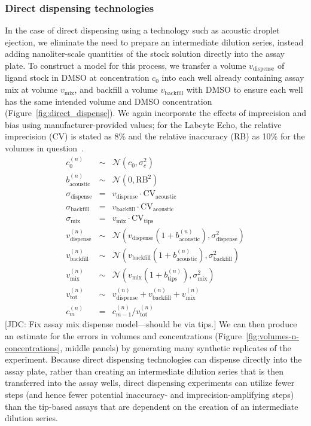 \documentclass[aps,pre,twocolumn,nofootinbib,superscriptaddress,linenumbers]{revtex4-1}
\begin{document}
\subsubsection*{Direct dispensing technologies}

In the case of direct dispensing using a technology such as acoustic droplet ejection, we eliminate the need to prepare an intermediate dilution series, instead adding nanoliter-scale quantities of the stock solution directly into the assay plate.
To construct a model for this process, we transfer a volume $v_\mathrm{dispense}$ of ligand stock in DMSO at concentration $c_0$ into each well already containing assay mix at volume $v_\mathrm{mix}$, and backfill a volume $v_\mathrm{backfill}$ with DMSO to ensure each well has the same intended volume and DMSO concentration (Figure~\ref{fig:direct_dispense}). 
We again incorporate the effects of imprecision and bias using manufacturer-provided values;
for the Labcyte Echo, the relative imprecision (CV) is stated as 8\% and the relative inaccuracy (RB) as 10\% for the volumes in question~\cite{_echo_2011}.
\begin{eqnarray}
c_0^{(n)} &\sim& \mathcal{N}(c_0, \sigma_c^2) \nonumber \label{equation:stock-concentration-uncertainty-simple} \\
b_\mathrm{acoustic}^{(n)} &\sim& \mathcal{N}(0, \mathrm{RB}^2) \nonumber \\
\sigma_\mathrm{dispense} &=& v_\mathrm{dispense} \cdot \mathrm{CV}_\mathrm{acoustic} \nonumber \\
\sigma_\mathrm{backfill} &=& v_\mathrm{backfill} \cdot \mathrm{CV}_\mathrm{acoustic} \nonumber \\
\sigma_\mathrm{mix} &=& v_\mathrm{mix} \cdot \mathrm{CV}_\mathrm{tips} \nonumber \\
v_\mathrm{dispense}^{(n)} &\sim& \mathcal{N}(v_\mathrm{dispense} (1 + b_\mathrm{acoustic}^{(n)}) , \sigma_\mathrm{dispense}^2) \nonumber \\
v_\mathrm{backfill}^{(n)} &\sim& \mathcal{N}(v_\mathrm{backfill} (1 + b_\mathrm{acoustic}^{(n)}), \sigma_\mathrm{backfill}^2) \nonumber \\
v_\mathrm{mix}^{(n)} &\sim& \mathcal{N}(v_\mathrm{mix} (1 + b_\mathrm{tips}^{(n)}), \sigma_\mathrm{mix}^2) \nonumber \\
v_\mathrm{tot}^{(n)} &\sim& v_\mathrm{dispense}^{(n)} + v_\mathrm{backfill}^{(n)} + v_\mathrm{mix}^{(n)} \nonumber \\
c_m^{(n)} &=& c_{m-1}^{(n)} / v_\mathrm{tot}^{(n)}
\end{eqnarray}
{\color{red}[JDC: Fix assay mix dispense model---should be via tips.]}
We can then produce an estimate for the errors in volumes and concentrations (Figure~\ref{fig:volumes-n-concentrations}, middle panels) by generating many synthetic replicates of the experiment.
Because direct dispensing technologies can dispense directly into the assay plate, rather than creating an intermediate dilution series that is then transferred into the assay wells, direct dispensing experiments can utilize fewer steps (and hence fewer potential inaccuracy- and imprecision-amplifying steps) than the tip-based assays that are dependent on the creation of an intermediate dilution series.
\end{document}
